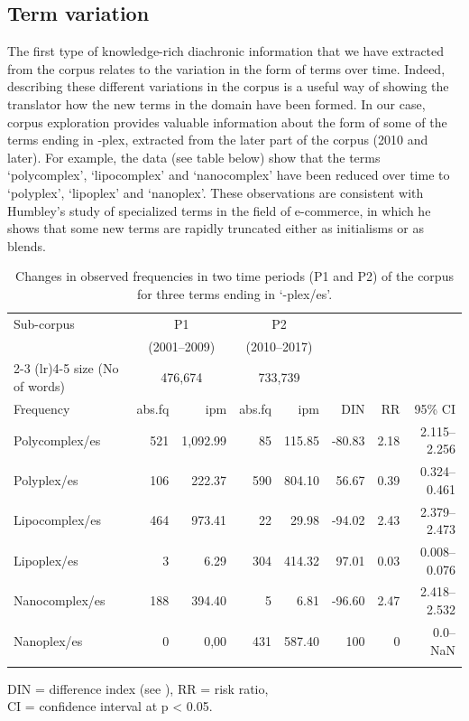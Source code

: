 \documentclass[output=paper]{langscibook}
\begin{document}
\subsection{Term variation}\label{sec:cuchet:3.1}

The first type of knowledge-rich diachronic information that we have extracted from the corpus relates to the variation in the form of terms over time. Indeed, describing these different variations in the corpus is a useful way of showing the translator how the new terms in the domain have been formed. In our case, corpus exploration provides valuable information about the form of some of the terms ending in -plex, extracted from the later part of the corpus (2010 and later). For example, the data (see table below) show that the terms ‘polycomplex’, ‘lipocomplex’ and ‘nanocomplex’ have been reduced over time to ‘polyplex’, ‘lipoplex’ and ‘nanoplex’. These observations are consistent with Humbley’s study \citeyear{Humbley2008} of specialized terms in the field of e-commerce, in which he shows that some new terms are rapidly truncated either as initialisms or as blends.

\begin{table}
\small
\begin{tabularx}{\textwidth}{X rr r@{}rrrr}
\lsptoprule
Sub-corpus & \multicolumn{2}{c}{P1}  & \multicolumn{2}{c}{P2}    \\
& \multicolumn{2}{c}{(2001–2009)} & \multicolumn{2}{c}{(2010–2017)}   \\
\cmidrule(lr){2-3}   \cmidrule(lr){4-5}
size (No of words) & \multicolumn{2}{c}{476,674} & \multicolumn{2}{c}{733,739} & \\
Frequency &  abs.fq &  {ipm} &  abs.fq &  {ipm} &  DIN & RR & 95\% CI\\
\midrule
Polycomplex/es &  521 &  {1,092.99} &  85 &  {115.85} &  {}-80.83 &   2.18 & 2.115--2.256\\
Polyplex/es &  106 &  {222.37} &  590 &  {804.10} &  56.67 &  0.39 & 0.324--0.461\\
Lipocomplex/es &  464 &  {973.41} &  22 &  {29.98} &   {}-94.02 &   2.43 & 2.379--2.473\\
Lipoplex/es &  3 &  {6.29} &  304 &  {414.32} &   97.01 &   0.03 & 0.008--0.076\\
Nanocomplex/es &  188 &  {394.40} &  5 &   {6.81} &   {}-96.60 &  2.47 & 2.418--2.532 \\
Nanoplex/es &  0 &  {0,00} &  431 &  {587.40} &  100 &   0 & 0.0--{NaN}\\
\lspbottomrule
\end{tabularx}
\caption{Changes in observed frequencies in two time periods (P1 and P2) of the corpus for three terms ending in ‘-plex/es’.}
{DIN = difference index (see \citealt{FidlerCvrček2015}), RR = risk ratio,\\
CI = confidence interval at p < 0.05.}
\label{tab:key:2}
\end{table}
\end{document}
